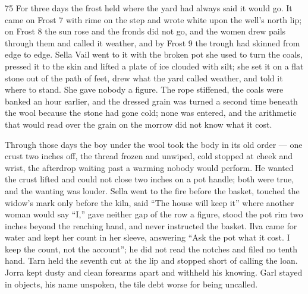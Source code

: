 
\scenebreak


\scenebreak


\scenebreak

\CRtailpiece
\begin{CRchronicle}{75}
For three days the frost held where the yard had always said it would go. It came on Frost 7 with rime on the step and wrote white upon the well’s north lip; on Frost 8 the sun rose and the fronds did not go, and the women drew pails through them and called it weather, and by Frost 9 the trough had skinned from edge to edge. Sella Vail went to it with the broken pot she used to turn the coals, pressed it to the skin and lifted a plate of ice clouded with silt; she set it on a flat stone out of the path of feet, drew what the yard called weather, and told it where to stand. She gave nobody a figure. The rope stiffened, the coals were banked an hour earlier, and the dressed grain was turned a second time beneath the wool because the stone had gone cold; none was entered, and the arithmetic that would read over the grain on the morrow did not know what it cost.

Through those days the boy under the wool took the body in its old order — one crust two inches off, the thread frozen and unwiped, cold stopped at cheek and wrist, the afterdrop waiting past a warming nobody would perform. He wanted the crust lifted and could not close two inches on a pot handle; both were true, and the wanting was louder. Sella went to the fire before the basket, touched the widow’s mark only before the kiln, said “The house will keep it” where another woman would say “I,” gave neither gap of the row a figure, stood the pot rim two inches beyond the reaching hand, and never instructed the basket. Ilva came for water and kept her count in her sleeve, answering “Ask the pot what it cost. I keep the count, not the account”; he did not read the notches and filed no tenth hand. Tarn held the seventh cut at the lip and stopped short of calling the loan. Jorra kept dusty and clean forearms apart and withheld his knowing. Garl stayed in objects, his name unspoken, the tile debt worse for being uncalled.


\end{CRchronicle}
